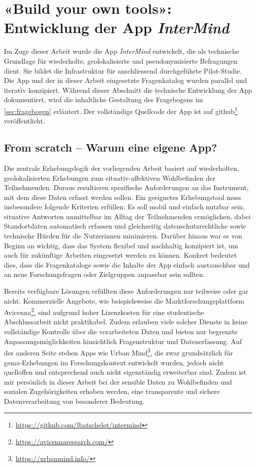\section{«Build your own tools»: Entwicklung der App \textit{InterMind}}

Im Zuge dieser Arbeit wurde die App \textit{InterMind} entwickelt, die als technische Grundlage für wiederholte, geolokalisierte und pseudonymisierte Befragungen dient. Sie bildet die Infrastruktur für anschliessend durchgeführte Pilot-Studie. Die App und der in dieser Arbeit eingesetzte Fragenkatalog wurden parallel und iterativ konzipiert. Während dieser Abschnitt die technische Entwicklung der App dokumentiert, wird die inhaltliche Gestaltung des Fragebogens im \cref{sec:fragebogen} erläutert. Der vollständige Quellcode der App ist auf \gls{github}\footnote{\href{https://github.com/lbatschelet/intermind}{https://github.com/lbatschelet/intermind}} veröffentlicht.


\subsection{From scratch – Warum eine eigene App?}

Die zentrale Erhebungslogik der vorliegenden Arbeit basiert auf wiederholten, geolokalisierten Erhebungen zum situativ-affektiven Wohlbefinden der Teilnehmenden. Daraus resultieren spezifische Anforderungen an das Instrument, mit dem diese Daten erfasst werden sollen. Ein geeignetes Erhebungstool muss insbesondere folgende Kriterien erfüllen: Es soll mobil und einfach nutzbar sein, situative Antworten unmittelbar im Alltag der Teilnehmenden ermöglichen, dabei Standortdaten automatisch erfassen und gleichzeitig datenschutzrechtliche sowie technische Hürden für die Nutzer\genderstern innen minimieren. Darüber hinaus war es von Beginn an wichtig, dass das System flexibel und nachhaltig konzipiert ist, um auch für zukünftige Arbeiten eingesetzt werden zu können. Konkret bedeutet dies, dass die Fragenkataloge sowie die Inhalte der App einfach austauschbar und an neue Forschungsfragen oder Zielgruppen anpassbar sein sollten.

Bereits verfügbare Lösungen erfüllten diese Anforderungen nur teilweise oder gar nicht. Kommerzielle Angebote, wie beispielsweise die Marktforschungsplattform Avicenna\footnote{\href{https://avicennaresearch.com/}{https://avicennaresearch.com/}}, sind aufgrund hoher Lizenzkosten für eine studentische Abschlussarbeit nicht praktikabel. Zudem erlauben viele solcher Dienste in keine vollständige Kontrolle über die verarbeiteten Daten und bieten nur begrenzte Anpassungsmöglichkeiten hinsichtlich Fragenstruktur und Datenerfassung. Auf der anderen Seite stehen Apps wie Urban Mind\footnote{\href{https://urbanmind.info/}{https://urbanmind.info/}}, die zwar grundsätzlich für \gls{gema}-Erhebungen im Forschungskontext entwickelt wurden, jedoch nicht quelloffen und entsprechend auch nicht eigenständig erweiterbar sind. Zudem ist mir persönlich in dieser Arbeit bei der sensible Daten zu Wohlbefinden und sozialen Zugehörigkeiten erhoben werden, eine transparente und sichere Datenverarbeitung von besonderer Bedeutung.


